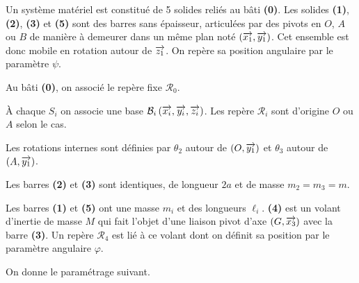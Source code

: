 \documentclass[10pt,fleqn]{article} %
\begin{document}
\def\pathfig{images}

\vspace{5cm}
\pagestyle{fancy}
\thispagestyle{plain}

\def\columnseprulecolor{\color{ocre}}
\setlength{\columnseprule}{0.4pt} 

\def\pathfig{images}

\ifprof
\else
\begin{multicols}{2}
\fi


Un système matériel est constitué de 5 solides reliés au bâti \textbf{(0)}. Les solides \textbf{(1)}, \textbf{(2)}, \textbf{(3)} et \textbf{(5)} sont des barres sans épaisseur, articulées par des pivots en $O$, $A$ ou $B$ de manière à demeurer dans un même plan noté $ \left(\overrightarrow{x_1},\overrightarrow{y_1}\right)$. Cet ensemble est donc mobile en rotation autour de $\overrightarrow{z_1}$. On repère sa position angulaire par le paramètre $\psi$. 

Au bâti \textbf{(0)}, on associé le repère fixe $\mathcal{R}_0$. 

À chaque $S_i$ on associe une base $\mathcal{B}_i\left(\overrightarrow{x_i},\overrightarrow{y_i},\overrightarrow{z_i} \right)$. Les repère $\mathcal{R}_i$ sont d'origine $O$ ou $A$ selon le cas. 

Les rotations internes sont définies par $\theta_2$ autour de $\left(O,\overrightarrow{y_1}\right)$ et $\theta_3$ autour de $\left(A,\overrightarrow{y_1}\right)$.

Les barres \textbf{(2)} et \textbf{(3)} sont identiques, de longueur $2a$ et de masse $m_2=m_3=m$.

Les barres \textbf{(1)} et \textbf{(5)} ont une masse $m_i$ et des longueurs $\ell_i$. \textbf{(4)} est un volant d'inertie de masse $M$ qui fait l'objet d'une liaison pivot d'axe $\left(G,\overrightarrow{x_3}\right)$ avec la barre \textbf{(3)}. Un repère $\mathcal{R}_4$ est lié à ce volant dont on définit sa position par le paramètre angulaire $\varphi$.

On donne le paramétrage suivant. 


\end{multicols}
\end{document}
